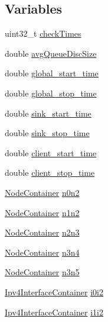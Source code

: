 \subsection*{Variables}
\begin{DoxyCompactItemize}
\item 
uint32\+\_\+t \hyperlink{pie-example_8cc_aeea215f1e5c3568bca85c126b9870c09}{check\+Times}
\item 
double \hyperlink{pie-example_8cc_a7058a9ca1256be97bd01c637ff170dc2}{avg\+Queue\+Disc\+Size}
\item 
double \hyperlink{pie-example_8cc_ab3a0ca969f11332a6b4ca8bc81e19ba7}{global\+\_\+start\+\_\+time}
\item 
double \hyperlink{pie-example_8cc_a374328526043935f11841a7ec7e396d5}{global\+\_\+stop\+\_\+time}
\item 
double \hyperlink{pie-example_8cc_a2c56dc9b543a4442a7edd8d680c4a1bc}{sink\+\_\+start\+\_\+time}
\item 
double \hyperlink{pie-example_8cc_a2462eef540f5b896f14d4ea7b7bb6214}{sink\+\_\+stop\+\_\+time}
\item 
double \hyperlink{pie-example_8cc_a18ff86acaf663200fbedb1f77d03b515}{client\+\_\+start\+\_\+time}
\item 
double \hyperlink{pie-example_8cc_aee714f5dcf74da2f73bcdd66c8a9e265}{client\+\_\+stop\+\_\+time}
\item 
\hyperlink{classns3_1_1NodeContainer}{Node\+Container} \hyperlink{pie-example_8cc_aeaa87dbd052b50719525adea0f586b36}{n0n2}
\item 
\hyperlink{classns3_1_1NodeContainer}{Node\+Container} \hyperlink{pie-example_8cc_a68f69f65725cbe7529e8b594708b8fc0}{n1n2}
\item 
\hyperlink{classns3_1_1NodeContainer}{Node\+Container} \hyperlink{pie-example_8cc_a4bc708159d3ec761080f4639c1c8f409}{n2n3}
\item 
\hyperlink{classns3_1_1NodeContainer}{Node\+Container} \hyperlink{pie-example_8cc_a71269c713841141f40860e991d435588}{n3n4}
\item 
\hyperlink{classns3_1_1NodeContainer}{Node\+Container} \hyperlink{pie-example_8cc_af4c498a2bfb720685107e00e03067e31}{n3n5}
\item 
\hyperlink{classns3_1_1Ipv4InterfaceContainer}{Ipv4\+Interface\+Container} \hyperlink{pie-example_8cc_a04048bb862423a1ed10deed33021fe0c}{i0i2}
\item 
\hyperlink{classns3_1_1Ipv4InterfaceContainer}{Ipv4\+Interface\+Container} \hyperlink{pie-example_8cc_abe23af3b1cb569ee9ee4ed7370791041}{i1i2}

\end{DoxyCompactItemize}
